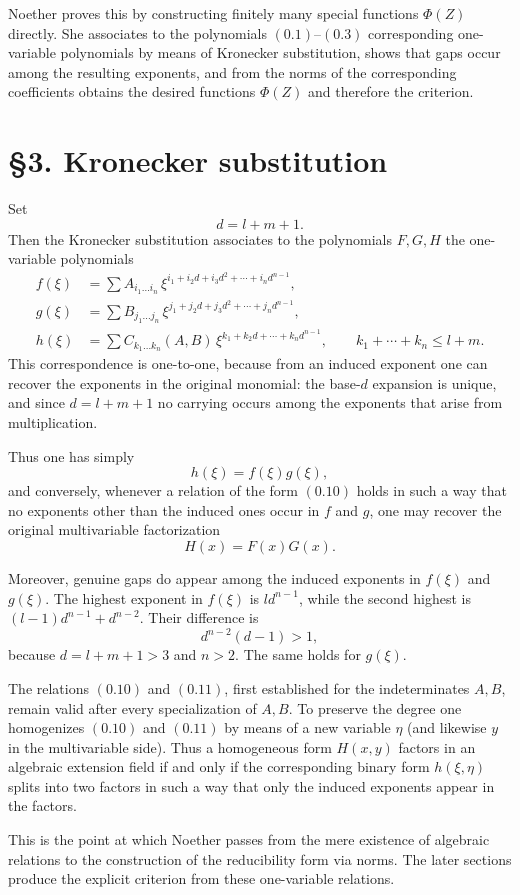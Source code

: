\documentclass[11pt]{article}
\begin{document}
Noether proves this by constructing finitely many special functions $\Phi(Z)$ directly. She associates to the polynomials \((0.1)\)--\((0.3)\) corresponding one-variable polynomials by means of Kronecker substitution, shows that gaps occur among the resulting exponents, and from the norms of the corresponding coefficients obtains the desired functions $\Phi(Z)$ and therefore the criterion.

\section*{\S 3. Kronecker substitution}

Set
\[
d=l+m+1.
\tag{0.6}
\]
Then the Kronecker substitution associates to the polynomials $F,G,H$ the one-variable polynomials
\begin{align}
f(\xi) &= \sum A_{i_1\dots i_n}\,\xi^{i_1+i_2d+i_3d^2+\cdots+i_nd^{n-1}}, \tag{0.7}\\
g(\xi) &= \sum B_{j_1\dots j_n}\,\xi^{j_1+j_2d+j_3d^2+\cdots+j_nd^{n-1}}, \tag{0.8}\\
h(\xi) &= \sum C_{k_1\dots k_n}(A,B)\,\xi^{k_1+k_2d+\cdots+k_nd^{n-1}},
\qquad k_1+\cdots+k_n\le l+m. \tag{0.9}
\end{align}
This correspondence is one-to-one, because from an induced exponent one can recover the exponents in the original monomial: the base-$d$ expansion is unique, and since $d=l+m+1$ no carrying occurs among the exponents that arise from multiplication.

Thus one has simply
\[
h(\xi)=f(\xi)g(\xi),
\tag{0.10}
\]
and conversely, whenever a relation of the form \((0.10)\) holds in such a way that no exponents other than the induced ones occur in $f$ and $g$, one may recover the original multivariable factorization
\[
H(x)=F(x)G(x).
\tag{0.11}
\]

Moreover, genuine gaps do appear among the induced exponents in $f(\xi)$ and $g(\xi)$. The highest exponent in $f(\xi)$ is $l d^{n-1}$, while the second highest is $(l-1)d^{n-1}+d^{n-2}$. Their difference is
\[
d^{n-2}(d-1)>1,
\]
because $d=l+m+1>3$ and $n>2$. The same holds for $g(\xi)$.

The relations \((0.10)\) and \((0.11)\), first established for the indeterminates $A,B$, remain valid after every specialization of $A,B$. To preserve the degree one homogenizes \((0.10)\) and \((0.11)\) by means of a new variable $\eta$ (and likewise $y$ in the multivariable side). Thus a homogeneous form $H(x,y)$ factors in an algebraic extension field if and only if the corresponding binary form $h(\xi,\eta)$ splits into two factors in such a way that only the induced exponents appear in the factors.

This is the point at which Noether passes from the mere existence of algebraic relations to the construction of the reducibility form via norms. The later sections produce the explicit criterion from these one-variable relations.
\end{document}
